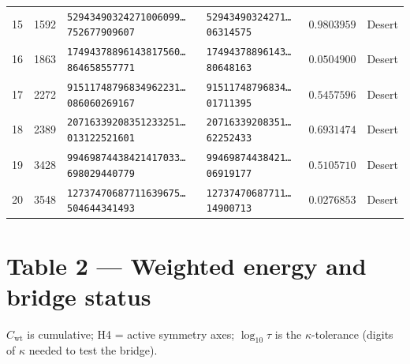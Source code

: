 \documentclass[11pt]{article}
\newcommand{\dt}{\ldots}
\begin{document}
\begin{longtable}{@{}r r l l r l@{}}
15 & 1592 & \texttt{52943490324271006099\dt752677909607} & \texttt{52943490324271\dt06314575}      & $0.9803959$ & Desert \\
16 & 1863 & \texttt{17494378896143817560\dt864658557771} & \texttt{17494378896143\dt80648163}      & $0.0504900$ & Desert \\
17 & 2272 & \texttt{91511748796834962231\dt086060269167} & \texttt{91511748796834\dt01711395}      & $0.5457596$ & Desert \\
18 & 2389 & \texttt{20716339208351233251\dt013122521601} & \texttt{20716339208351\dt62252433}      & $0.6931474$ & Desert \\
19 & 3428 & \texttt{99469874438421417033\dt698029440779} & \texttt{99469874438421\dt06919177}      & $0.5105710$ & Desert \\
20 & 3548 & \texttt{12737470687711639675\dt504644341493} & \texttt{12737470687711\dt14900713}      & $0.0276853$ & Desert \\
\end{longtable}
\normalsize

\section*{Table 2 --- Weighted energy and bridge status}
$C_{\text{wt}}$ is cumulative; H4 = active symmetry axes; $\log_{10}\tau$ is the
$\kappa$-tolerance (digits of $\kappa$ needed to test the bridge).
\end{document}
